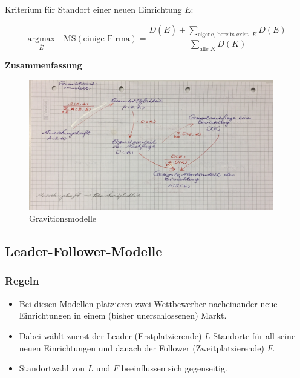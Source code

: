       \par Kriterium für Standort einer neuen Einrichtung $\bar{E}$:

      \[ \underset{\bar{E}}{\text{argmax}} \quad \text{MS}(\text{einige Firma}) = \frac{D(\bar{E}) + \sum_{\text{eigene, bereits exist. } E}D(E)}{\sum_{\text{alle } K}{D(K)}}\]

      \textbf{Zusammenfassung}

      \begin{figure}[H]
        \centering
        \includegraphics[width=0.95\textwidth]{Images/Gravitionsmodelle.JPG}
        \caption{Gravitionsmodelle}
        \label{fig:Gravitionsmodelle}
      \end{figure}



      \begin{exmp}
         \color{blue}{Aufgabe 4}
       \end{exmp}     

      

    \subsection{Leader-Follower-Modelle} %
    \label{sub:leader_follower_modelle}

      \subsubsection{Regeln} %
      \label{ssub:regeln}
        \begin{itemize}
          \item Bei diesen Modellen platzieren zwei Wettbewerber nacheinander neue Einrichtungen in einem (bisher unerschlossenen) Markt.
          \item Dabei wählt zuerst der Leader (Erstplatzierende) $L$ Standorte für all seine neuen Einrichtungen und danach der Follower (Zweitplatzierende) $F$.
          \item Standortwahl von $L$ und $F$ beeinflussen sich gegenseitig.
        \end{itemize}


